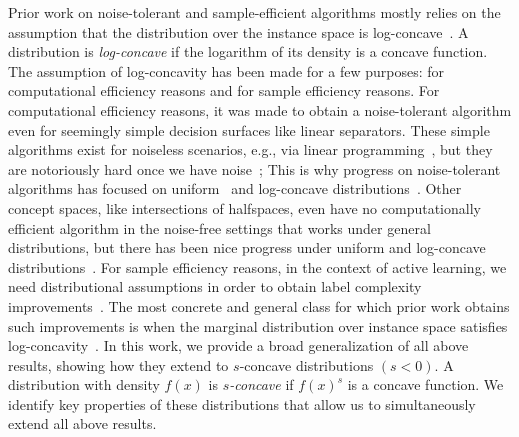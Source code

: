 \documentclass[11pt]{article}
\begin{document}
Prior work on noise-tolerant and sample-efficient algorithms mostly relies on the assumption that the distribution over the instance space is log-concave~\cite{applegate1991sampling,caramanis2007inequality,balcan2013active,xu2017noise}. A distribution is \emph{log-concave} if the logarithm of its density is a concave function. The assumption of log-concavity has been made for a few purposes: for computational efficiency reasons and for sample efficiency reasons. For computational efficiency reasons, it was made to obtain a noise-tolerant algorithm even for seemingly simple decision surfaces like linear separators. These simple algorithms exist for noiseless scenarios, e.g., via linear programming~\cite{servedio2001efficient}, but they are notoriously hard once we have noise~\cite{daniely2016complexity,klivans2014embedding,guruswami2009hardness}; This is why progress on noise-tolerant algorithms has focused on uniform~\cite{kalai2008agnostically,klivans2009learning} and log-concave distributions~\cite{awasthi2017power}. Other concept spaces, like intersections of halfspaces, even have no computationally efficient algorithm in the noise-free settings that works under general distributions, but there has been nice progress under uniform and log-concave distributions~\cite{klivans2009baum}. For sample efficiency reasons,  in the context of active learning,  we need distributional assumptions in order to obtain label complexity improvements~\cite{dasgupta2004analysis}. The most concrete and general class for which prior work obtains such improvements is when the marginal distribution over instance space satisfies log-concavity~\cite{zhang2014beyond,balcan2013active}.
In this work, we provide a broad generalization of all above results, showing how they extend to $s$-concave distributions $(s<0)$. A distribution with density $f(x)$ is \emph{$s$-concave} if $f(x)^s$ is a concave function. We identify key properties of these distributions that allow us to simultaneously extend all above results.
\end{document}
